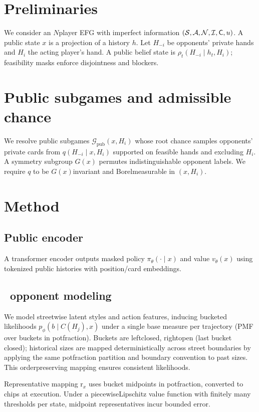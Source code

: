 \section{Preliminaries}
We consider an $N$\textendash player EFG with imperfect information $(\mathcal{S},\mathcal{A},\mathcal{N},\mathcal{I},\mathsf{C},u)$. A public state $x$ is a projection of a history $h$. Let $H_{-i}$ be opponents’ private hands and $H_i$ the acting player's hand. A public belief state is $\rho_t(H_{-i}\mid h_t,H_i)$; feasibility masks enforce disjointness and blockers.

\section{Public subgames and admissible chance}
We re\textendash solve public subgames $\mathcal{G}_{\text{pub}}(x,H_i)$ whose root chance samples opponents’ private cards from $q(H_{-i}\mid x,H_i)$ supported on feasible hands and excluding $H_i$. A symmetry subgroup $G(x)$ permutes indistinguishable opponent labels. We require $q$ to be $G(x)$\textendash invariant and Borel\textendash measurable in $(x,H_i)$.

\section{Method}
\subsection{Public encoder}
A transformer encoder outputs masked policy $\pi_\theta(\cdot\mid x)$ and value $v_\theta(x)$ using tokenized public histories with position/card embeddings.

\subsection{\sCRF\ opponent modeling}
We model streetwise latent styles and action features, inducing bucketed likelihoods $p_\phi(b\mid C(H_j),x)$ under a single base measure per trajectory (PMF over buckets in pot\textendash fraction). Buckets are left\textendash closed, right\textendash open (last bucket closed); historical sizes are mapped deterministically across street boundaries by applying the same pot\textendash fraction partition and boundary convention to past sizes. This order\textendash preserving mapping ensures consistent likelihoods.

Representative mapping r$_x$ uses bucket midpoints in pot\textendash fraction, converted to chips at execution. Under a piecewise\textendash Lipschitz value function with finitely many thresholds per state, midpoint representatives incur bounded error.

